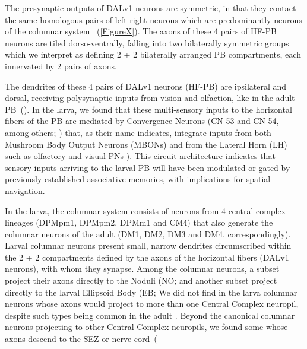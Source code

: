     The presynaptic outputs of DALv1 neurons are symmetric, in that they contact the same homologous pairs of left-right neurons which are predominantly neurons of the columnar system ~(\ref{FigureX}).
    The axons of these 4 pairs of HF-PB neurons are tiled dorso-ventrally, falling into two bilaterally symmetric groups which we interpret as defining 2 + 2 bilaterally arranged PB compartments, each innervated by 2 pairs of axons. %

    The dendrites of these 4 pairs of DALv1 neurons (HF-PB) are ipsilateral and dorsal, receiving polysynaptic inputs from vision and olfaction, like in the adult PB~(\citep{hulse2021connectome}). In the larva, we found that these multi-sensory inputs to the horizontal fibers of the PB are mediated by Convergence Neurons (CN-53 and CN-54, among others; \citealp{eschbach2021}) that, as their name indicates, integrate inputs from both Mushroom Body Output Neurons (MBONs) and from the Lateral Horn (LH) such as olfactory and visual PNs \citep{EsbachFushiki2021}). This circuit architecture indicates that sensory inputs arriving to the larval PB will have been modulated or gated by previously established associative memories, with implications for spatial navigation.



    In the larva, the columnar system consists of neurons from 4 central complex lineages (DPMpm1, DPMpm2, DPMm1 and CM4) that also generate the columnar neurons of the adult (DM1, DM2, DM3 and DM4, correspondingly).
    Larval columnar neurons present small, narrow dendrites circumscribed within the 2 + 2 compartments defined by the axons of the horizontal fibers (DALv1 neurons), with whom they synapse.
    Among the columnar neurons, a subset project their axons directly to the Noduli (NO; %
    and another subset project directly to the larval Ellipsoid Body (EB;%
    We did not find in the larva columnar neurons whose axons would project to more than one Central Complex neuropil, despite such types being common in the adult \citep{wolff2015neuroarchitecture, wolff2018neuroarchitecture, hulse2021connectome}.
    Beyond the canonical columnar neurons projecting to other Central Complex neuropils, we found some whose axons descend to the SEZ or nerve cord~(%

